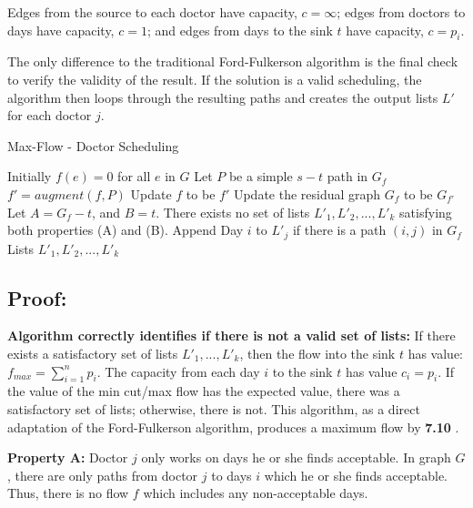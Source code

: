 \documentclass{article}
\begin{document}
Edges from the source to each doctor have capacity, $c=\infty$; edges from doctors to days have capacity, $c = 1$; and edges from days to the sink $t$ have capacity, $c=p_i$.

The only difference to the traditional Ford-Fulkerson algorithm is the final check to verify the validity of the result.  If the solution is a valid scheduling, the algorithm then loops through the resulting paths and creates the output lists $L'$ for each doctor $j$.

\newpage 
\begin{algorithm}
\caption{Max-Flow - Doctor Scheduling}
\label{alg1}
\begin{algorithmic}
\State Initially $f(e)=0$ for all $e$ in $G$
	\State Let $P$ be a simple $s-t$ path in $G_f$
	\State $f' = augment(f, P)$
	\State Update $f$ to be $f'$
	\State Update the residual graph $G_f$ to be $G_{f'}$
\EndWhile
\State Let $ A  = G_f - {t}$, and $B = {t}$.
	\State \Return There exists no set of lists $L'_1, L'_2, ..., L'_k$ satisfying both properties (A) and (B).
\Else
		\State Append Day $i$ to $L'_j$ if there is a path $(i, j)$ in $G_f$
	\EndFor
\EndIf
\State \Return Lists $L'_1, L'_2, ..., L'_k$
\end{algorithmic}
\end{algorithm}

\vspace{-.5cm}
\subsection*{Proof:}
\noindent \textbf{Algorithm correctly identifies if there is not a valid set of lists:}
\newline If there exists a satisfactory set of lists $L'_1, ..., L'_k$, then the flow into the sink $t$ has value: $f_{max} = \sum_{i = 1}^n p_i$.  The capacity from each day $i$ to the sink $t$ has value $c_i = p_i$.  If the value of the min cut/max flow has the expected value, there was a satisfactory set of lists; otherwise, there is not.  This algorithm, as a direct adaptation of the Ford-Fulkerson algorithm, produces a maximum flow by \textbf{7.10} \cite{algDesign}.

\noindent \textbf{Property A:} Doctor $j$ only works on days he or she finds acceptable. \newline
In graph $G$, there are only paths from doctor $j$ to days $i$ which he or she finds acceptable.  Thus, there is no flow $f$ which includes any non-acceptable days.
\end{document}
